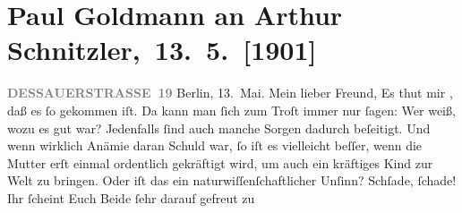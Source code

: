 

         
         \renewcommand{\erwaehntePersonen}{Personen: Paul Goldmann, Robert Hirschfeld, Karl Felix Kohler, Olga Schnitzler, Heinrich Schnitzler, Louise Schnitzler}
         \renewcommand{\erwaehnteInstitutionen}{Institutionen: Neue Freie Presse}
         \renewcommand{\erwaehnteOrte}{Orte: Berlin, Dessauer Straße, Klosters Dorf, Pörtschach, Schweiz, Velden am Wörthersee, Wien, Wörthersee}
         \renewcommand{\erwaehnteWerke}{}
               \section[ Paul Goldmann an Arthur Schnitzler, 13. 5. {[}1901{]}]{ Paul Goldmann an Arthur Schnitzler, 13. 5. {[}1901{]}}\nopagebreak{}\rehead{ }\begin{ledgroupsized}[t]{13cm}\normalsize\beginnumbering \toendnotes[C]{\smallbreak\pagebreak[2]} 
\toendnotes[C]{\smallbreak}\pstart
           \noindent{}\raggedleft{}{\pb}\textcolor{gray}{\textbf{DESSAUERSTRASSE 19}}\pend
           \pstart
           Berlin, 13. Mai.\pend
           \pstart\center{}Mein lieber Freund,\pend\pstart
           Es thut mir \label{K_L03066-1v}\label{K_L03066-1h}, daß es ſo gekommen
               iſt. Da kann man ſich zum Troſt immer nur ſagen: Wer weiß, wozu es gut war?
               Jedenfalls ſind auch manche Sorgen dadurch beſeitigt. Und wenn wirklich Anämie daran
               Schuld war, ſo iſt es vielleicht beſſer, wenn die Mutter erſt einmal ordentlich gekräftigt wird, um {\pb}auch ein kräftiges Kind zur Welt zu bringen. Oder
               iſt das ein naturwiſſenſchaftlicher Unſinn? Schſade, ſchade! Ihr ſcheint Euch Beide ſehr darauf gefreut zu

\end{ledgroupsized}
